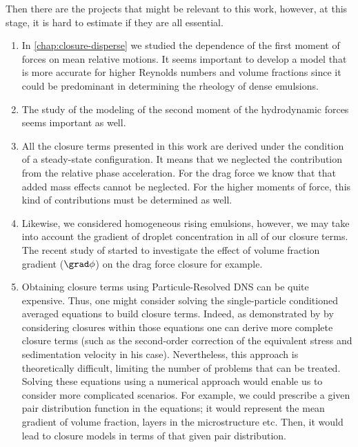 Then there are the projects that might be relevant to this work, 
however, at this stage, it is hard to estimate if they are all essential.
\begin{enumerate}
    \item In \ref{chap:closure-disperse} we studied the dependence of the first moment of forces on mean relative motions.
    It seems important to develop a model that is more accurate for higher Reynolds numbers and volume fractions since it could be predominant in determining the rheology of dense emulsions. 
    \item The study of the modeling of the second moment of the hydrodynamic forces seems important as well. 
    \item All the closure terms presented in this work are derived under the condition of a steady-state configuration.
    It means that we neglected the contribution from the relative phase acceleration. 
    For the drag force we know that that added mass effects cannot be neglected. 
    For the higher moments of force, this kind of contributions must be determined as well. 
    \item Likewise, we considered homogeneous rising emulsions, however, we may take into account the gradient of droplet concentration in all of our closure terms. 
    The recent study of \citet{wang2024effect} started to investigate the effect of volume fraction gradient  ($\grad\phi$) on the drag force closure for example.  
    \item 
    Obtaining closure terms using  Particule-Resolved DNS can be quite expensive. 
    Thus, one might consider solving the single-particle conditioned averaged equations to build closure terms.  
    Indeed, as demonstrated by \citet{hinch1977averaged} by considering closures within those equations one can derive more complete closure terms (such as the second-order correction of the equivalent stress and sedimentation velocity in his case). 
    Nevertheless, this approach is theoretically difficult, limiting the number of problems that can be treated. 
    Solving these equations using a numerical approach would enable us to consider more complicated scenarios. 
    For example, we could prescribe a given pair distribution function in the equations; it would represent the mean gradient of volume fraction, layers in the microstructure etc. 
    Then, it would lead to closure models in terms of that given pair distribution. 
\end{enumerate}

